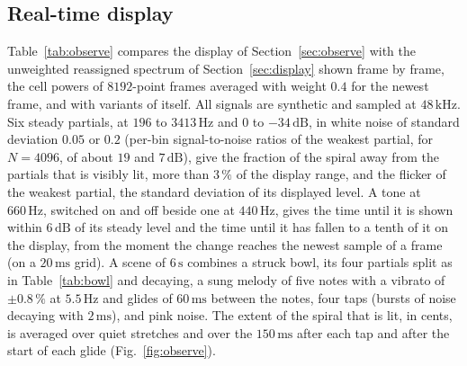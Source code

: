 \documentclass[10pt,a4paper,twocolumn]{article}
\newcommand{\Hz}{\,\mathrm{Hz}}
\newcommand{\dB}{\,\mathrm{dB}}
\newcommand{\s}{\,\mathrm{s}}
\newcommand{\ms}{\,\mathrm{ms}}
\begin{document}
\subsection{Real-time display}
\label{sec:evalobs}

Table~\ref{tab:observe} compares the display of Section~\ref{sec:observe} with the unweighted reassigned spectrum of Section~\ref{sec:display} shown frame by frame, the cell powers of $8192$-point frames averaged with weight $0.4$ for the newest frame, and with variants of itself. All signals are synthetic and sampled at $48\,\mathrm{kHz}$. Six steady partials, at $196$ to $3413\Hz$ and $0$ to $-34\dB$, in white noise of standard deviation $0.05$ or $0.2$ (per-bin signal-to-noise ratios of the weakest partial, for $N = 4096$, of about $19$ and $7\dB$), give the fraction of the spiral away from the partials that is visibly lit, more than $3\,\%$ of the display range, and the flicker of the weakest partial, the standard deviation of its displayed level. A tone at $660\Hz$, switched on and off beside one at $440\Hz$, gives the time until it is shown within $6\dB$ of its steady level and the time until it has fallen to a tenth of it on the display, from the moment the change reaches the newest sample of a frame (on a $20\ms$ grid). A scene of $6\s$ combines a struck bowl, its four partials split as in Table~\ref{tab:bowl} and decaying, a sung melody of five notes with a vibrato of $\pm 0.8\,\%$ at $5.5\Hz$ and glides of $60\ms$ between the notes, four taps (bursts of noise decaying with $2\ms$), and pink noise. The extent of the spiral that is lit, in cents, is averaged over quiet stretches and over the $150\ms$ after each tap and after the start of each glide (Fig.~\ref{fig:observe}).
\end{document}
